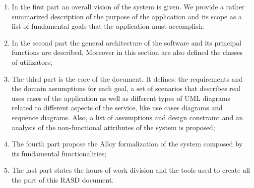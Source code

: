 \begin{enumerate}
  \item In the first part an overall vision of the system is given. We provide a rather summarized description of the purpose of the application and its scope as a list of fundamental goals that the application must accomplish;
  \item In the second part the general architecture of the software and its principal functions are described. Moreover in this section are also defined the classes of utilizators;
  \item The third part is the core of the document. It defines: the requirements and the domain assumptions for each goal, 
  a set of scenarios that describes real uses cases of the application as well as different types of UML diagrams related to different aspects of the service, like use cases diagrams and sequence diagrams. Also, a list of assumptions and design constraint and an analysis of the non-functional attributes of the system is proposed;
  \item The fourth part propose the Alloy formalization of the system composed by its fundamental functionalities;  
  \item The last part states the hours of work division and the tools used to create all the part of this RASD document.
\end{enumerate}
